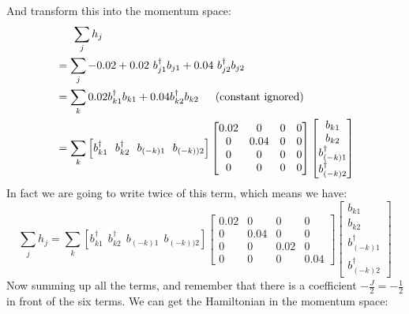 \documentclass[letterpaper,10pt]{article}
\begin{document}
And transform this into the momentum space:$$
\begin{aligned}
    &\indent \sum_j  h_j\\
    &=\sum _j -0.02+0.02\ b_{j1}^{\dagger}b_{j1}+0.04\ b_{j2}^{\dagger}b_{j2}\\
    &=\sum_{k}0.02b_{k1}^{\dagger}b_{k1}+0.04b_{k2}^{\dagger}b_{k2} \indent \text{(constant ignored)}\\
    &=\sum_k \left[
        b_{k1}^{\dagger} \ \ 
        b_{k2}^{\dagger}\  \ 
        b_{(-k)1}\ \ 
        b_{(-k))2}\right]
       \begin{bmatrix}
        0.02 & 0 & 0 & 0 \\
           0 &  0.04 & 0 &0 \\
           0 &  0 & 0 &0\\
            0 & 0 & 0& 0
            \end{bmatrix}\begin{bmatrix}
                b_{k1}  \\
                b_{k2}  \\
                b_{(-k)1}^{\dagger}\\
                b_{(-k)2}^{\dagger}
                \end{bmatrix}
\end{aligned}
$$
In fact we are going to write twice of this term, which means we have:
$$\sum_j  h_j=\sum_k \left[
    b_{k1}^{\dagger} \ \ 
    b_{k2}^{\dagger}\  \ 
    b_{(-k)1}\ \ 
    b_{(-k))2}\right]
   \begin{bmatrix}
    0.02 & 0 & 0 & 0 \\
       0 &  0.04 & 0 &0 \\
       0 &  0 & 0.02 &0\\
        0 & 0 & 0& 0.04
        \end{bmatrix}\begin{bmatrix}
            b_{k1}  \\
            b_{k2}  \\
            b_{(-k)1}^{\dagger}\\
            b_{(-k)2}^{\dagger}
            \end{bmatrix}
$$
Now summing up all the terms, and remember that there is a coefficient $-\frac{J}{2}=-\frac{1}{2}$ in front of the six terms. We can get the Hamiltonian in the momentum space:
\end{document}
